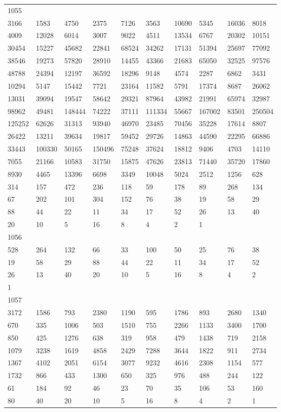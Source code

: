 \begin{longtable}{*{10}{l}}
1055&&&&&&&&&\\
3166& 1583& 4750& 2375& 7126& 3563& 10690& 5345& 16036& 8018\\
4009& 12028& 6014& 3007& 9022& 4511& 13534& 6767& 20302& 10151\\
30454& 15227& 45682& 22841& 68524& 34262& 17131& 51394& 25697& 77092\\
38546& 19273& 57820& 28910& 14455& 43366& 21683& 65050& 32525& 97576\\
48788& 24394& 12197& 36592& 18296& 9148& 4574& 2287& 6862& 3431\\
10294& 5147& 15442& 7721& 23164& 11582& 5791& 17374& 8687& 26062\\
13031& 39094& 19547& 58642& 29321& 87964& 43982& 21991& 65974& 32987\\
98962& 49481& 148444& 74222& 37111& 111334& 55667& 167002& 83501& 250504\\
125252& 62626& 31313& 93940& 46970& 23485& 70456& 35228& 17614& 8807\\
26422& 13211& 39634& 19817& 59452& 29726& 14863& 44590& 22295& 66886\\
33443& 100330& 50165& 150496& 75248& 37624& 18812& 9406& 4703& 14110\\
7055& 21166& 10583& 31750& 15875& 47626& 23813& 71440& 35720& 17860\\
8930& 4465& 13396& 6698& 3349& 10048& 5024& 2512& 1256& 628\\
314& 157& 472& 236& 118& 59& 178& 89& 268& 134\\
67& 202& 101& 304& 152& 76& 38& 19& 58& 29\\
88& 44& 22& 11& 34& 17& 52& 26& 13& 40\\
20& 10& 5& 16& 8& 4& 2& 1& \\

1056&&&&&&&&&\\
528& 264& 132& 66& 33& 100& 50& 25& 76& 38\\
19& 58& 29& 88& 44& 22& 11& 34& 17& 52\\
26& 13& 40& 20& 10& 5& 16& 8& 4& 2\\
1& \\

1057&&&&&&&&&\\
3172& 1586& 793& 2380& 1190& 595& 1786& 893& 2680& 1340\\
670& 335& 1006& 503& 1510& 755& 2266& 1133& 3400& 1700\\
850& 425& 1276& 638& 319& 958& 479& 1438& 719& 2158\\
1079& 3238& 1619& 4858& 2429& 7288& 3644& 1822& 911& 2734\\
1367& 4102& 2051& 6154& 3077& 9232& 4616& 2308& 1154& 577\\
1732& 866& 433& 1300& 650& 325& 976& 488& 244& 122\\
61& 184& 92& 46& 23& 70& 35& 106& 53& 160\\
80& 40& 20& 10& 5& 16& 8& 4& 2& 1\\


\end{longtable}
